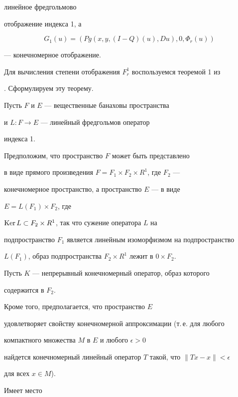 линейное фредгольмово 


отображение индекса 1, а


$$


G_1(u)=(Pg(x,y,(I-Q)(u),Du),0,\Phi_r(u))


$$ 


--- конечномерное отображение. 





Для вычисления степени отображения $F^1_r$ воспользуемся теоремой 1 из


\cite{moe0}. Сформулируем эту теорему.


 


Пусть $F$ и $E$ --- вещественные банаховы пространства


и $L: F\to E$ --- линейный фредгольмов оператор


индекса 1. 


Предположим, что пространство $F$ может быть представлено


в виде прямого произведения $F=F_1\times F_2\times R^1$, где $F_2$ ---


конечномерное пространство, а пространство $E$ --- в виде 


$E=L(F_1)\times F_2$, где


$\operatorname{Ker} L\subset F_2\times R^1$, так что сужение оператора $L$ на


подпространство $F_1$ является линейным изоморфизмом на подпространство


$L(F_1)$, образ подпространства $F_2\times R^1$ лежит в $0\times F_2$.





Пусть $K$ --- непрерывный конечномерный оператор, образ которого


содержится в $F_2$.


Кроме того, предполагается, что пространство $E$ 


удовлетворяет свойству конечномерной аппроксимации (т.\,е. для любого 


компактного множества $M$ в $E$ и любого $\epsilon >0$


найдется конечномерный линейный оператор $T$ такой, что $\|Tx-x\|<\epsilon $


для всех $x\in M$).





Имеет место





